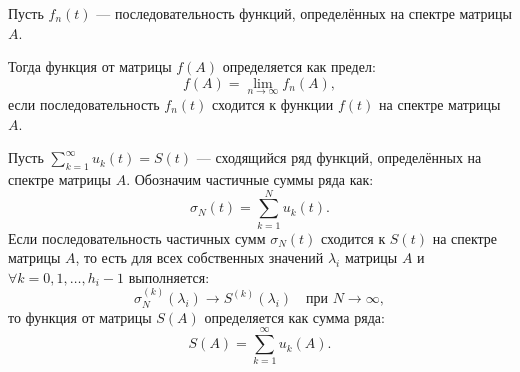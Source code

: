 \begin{shdef}
    \begin{definition}
    \leavevmode \nl 

    Пусть \( f_n(t) \) — последовательность функций, определённых на спектре матрицы \( A \).
    
    Тогда функция от матрицы \( f(A) \) определяется как предел:
    \[
    f(A) = \lim_{n \to \infty} f_n(A),
    \]
    если последовательность \( f_n(t) \) сходится к функции \( f(t) \) на спектре матрицы \( A \).
    \end{definition}
\end{shdef}

\begin{shdef}
    \begin{definition}
        \leavevmode \nl 

        Пусть \( \sum_{k=1}^{\infty} u_k(t) = S(t) \) — сходящийся ряд функций, определённых на спектре матрицы \( A \). Обозначим частичные суммы ряда как:
        \[
        \sigma_N(t) = \sum_{k=1}^{N} u_k(t).
        \]
        Если последовательность частичных сумм \( \sigma_N(t) \) сходится к \( S(t) \) на спектре \\матрицы \( A \), то есть для всех собственных значений \( \lambda_i \) матрицы \( A \) и \\\( \forall k = 0, 1, \ldots, h_i - 1 \) выполняется:
        \[
        \sigma_N^{(k)}(\lambda_i) \to S^{(k)}(\lambda_i) \quad \text{при } N \to \infty,
        \]
        то функция от матрицы \( S(A) \) определяется как сумма ряда:
        \[
        S(A) = \sum_{k=1}^{\infty} u_k(A).
        \]
    \end{definition}
\end{shdef}



